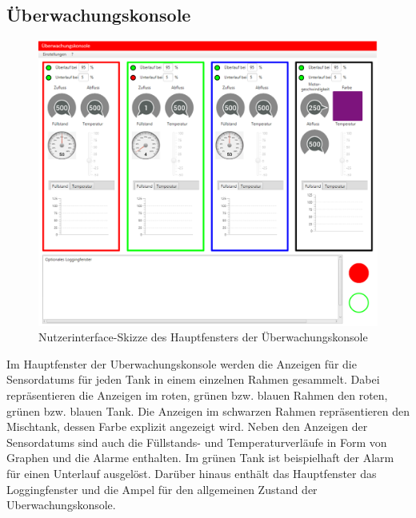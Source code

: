 \documentclass[parskip=full]{scrartcl}
\begin{document}
\pagebreak

\subsection{Überwachungskonsole}
\begin{figure}[H]
  \centering
  \includegraphics[scale=0.5]{media/ui-client/ui-uw.png}
  \caption{Nutzerinterface-Skizze des Hauptfensters der Überwachungskonsole}
\end{figure}
Im Hauptfenster der \gls{Uberwachungskonsole} werden die Anzeigen für die \glspl{Sensordatum} für jeden Tank in einem einzelnen Rahmen gesammelt. Dabei repräsentieren die Anzeigen im roten, grünen bzw. blauen Rahmen den roten, grünen bzw. blauen Tank. Die Anzeigen im schwarzen Rahmen repräsentieren den Mischtank, dessen Farbe explizit angezeigt wird.
Neben den Anzeigen der \glspl{Sensordatum} sind auch die Füllstands- und Temperaturverläufe in Form von Graphen und die Alarme enthalten. Im grünen Tank ist beispielhaft der Alarm für einen Unterlauf ausgelöst.
Darüber hinaus enthält das Hauptfenster das Loggingfenster und die Ampel für den allgemeinen Zustand der \gls{Uberwachungskonsole}.
\end{document}
